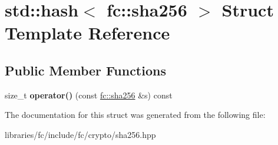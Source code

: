 \hypertarget{structstd_1_1hash_3_01fc_1_1sha256_01_4}{}\section{std\+:\+:hash$<$ fc\+:\+:sha256 $>$ Struct Template Reference}
\label{structstd_1_1hash_3_01fc_1_1sha256_01_4}
\subsection*{Public Member Functions}
\begin{DoxyCompactItemize}
\item 
\mbox{\label{structstd_1_1hash_3_01fc_1_1sha256_01_4_a9ebcc9ac56bc809132acdcd49825afe0}} 
size\+\_\+t {\bfseries operator()} (const \mbox{\hyperlink{classfc_1_1sha256}{fc\+::sha256}} \&s) const
\end{DoxyCompactItemize}


The documentation for this struct was generated from the following file\+:\begin{DoxyCompactItemize}
\item 
libraries/fc/include/fc/crypto/sha256.\+hpp\end{DoxyCompactItemize}
